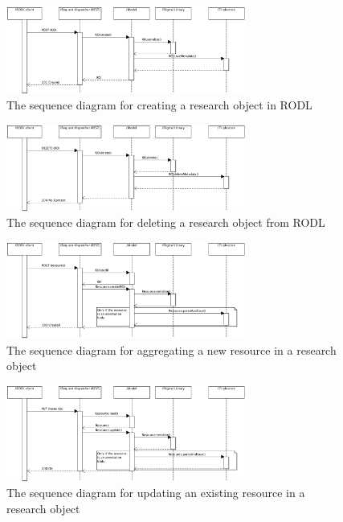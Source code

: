 \begin{figure}[!hb]
\centering
\includegraphics[width=0.7\textwidth]{Figures/RODL/ROcreate.png}
\caption{The sequence diagram for creating a research object in RODL}
\label{ROCreate}
\end{figure}

\begin{figure}[!hb]
\centering
\includegraphics[width=0.7\textwidth]{Figures/RODL/ROdelete.png}
\caption{The sequence diagram for deleting a research object from RODL}
\label{RODelete}
\end{figure}

\begin{figure}[!hb]
\centering
\includegraphics[width=0.7\textwidth]{Figures/RODL/ResourceAdd.png}
\caption{The sequence diagram for aggregating a new resource in a research object}
\label{ResourceAdd}
\end{figure}

\begin{figure}[!hb]
\centering
\includegraphics[width=0.7\textwidth]{Figures/RODL/ResourceUpdate.png}
\caption{The sequence diagram for updating an existing resource in a research object}
\label{ResourceUpdate}
\end{figure}

